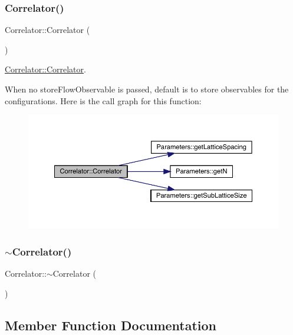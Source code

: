 \subsubsection{\texorpdfstring{Correlator()}{Correlator()}\hspace{0.1cm}{\footnotesize\ttfamily [2/2]}}
{\footnotesize\ttfamily Correlator\+::\+Correlator (\begin{DoxyParamCaption}{ }\end{DoxyParamCaption})}



\mbox{\hyperlink{class_correlator_aff48ef3bf789e9c6231eacc21cd9ed9a}{Correlator\+::\+Correlator}}. 

When no store\+Flow\+Observable is passed, default is to store observables for the configurations. Here is the call graph for this function\+:
\nopagebreak
\begin{figure}[H]
\begin{center}
\leavevmode
\includegraphics[width=350pt]{class_correlator_a6114955836dba0b4b61138490cd3fe91_cgraph}
\end{center}
\end{figure}
\mbox{\label{class_correlator_a48307431ca91b41319c6b68c6684634d}} 
\subsubsection{\texorpdfstring{$\sim$Correlator()}{~Correlator()}}
{\footnotesize\ttfamily Correlator\+::$\sim$\+Correlator (\begin{DoxyParamCaption}{ }\end{DoxyParamCaption})\hspace{0.3cm}{\ttfamily [virtual]}}



\subsection{Member Function Documentation}
\mbox{\label{class_correlator_ab33502ff305f891c5c2e6d66a26a0247}} 
